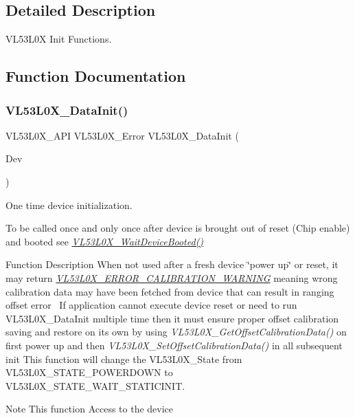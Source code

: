 \subsection{Detailed Description}
V\+L53\+L0X Init Functions. 



\subsection{Function Documentation}
\mbox{\label{group__VL53L0X__init__group_gabb81d6ad638363d555a1b1b038b23354}} 
\subsubsection{\texorpdfstring{V\+L53\+L0\+X\+\_\+\+Data\+Init()}{VL53L0X\_DataInit()}}
{\footnotesize\ttfamily V\+L53\+L0\+X\+\_\+\+A\+PI V\+L53\+L0\+X\+\_\+\+Error V\+L53\+L0\+X\+\_\+\+Data\+Init (\begin{DoxyParamCaption}\item[{\hyperlink{group__VL53L0X__platform__group_ga2d6405308b1dd524b462f1b8fb97d167}{V\+L53\+L0\+X\+\_\+\+D\+EV}}]{Dev }\end{DoxyParamCaption})}



One time device initialization. 

To be called once and only once after device is brought out of reset (Chip enable) and booted see {\itshape \hyperlink{group__VL53L0X__init__group_ga079f2bafbcb26cb4ccf897bb835fcdc8}{V\+L53\+L0\+X\+\_\+\+Wait\+Device\+Booted()}} 

\begin{DoxyParagraph}{Function Description}
When not used after a fresh device \char`\"{}power up\char`\"{} or reset, it may return {\itshape \hyperlink{group__VL53L0X__define__Error__group_ga4bc7046c2d7a01b8c925af91d5325a65}{V\+L53\+L0\+X\+\_\+\+E\+R\+R\+O\+R\+\_\+\+C\+A\+L\+I\+B\+R\+A\+T\+I\+O\+N\+\_\+\+W\+A\+R\+N\+I\+NG}} meaning wrong calibration data may have been fetched from device that can result in ranging offset error~\newline
If application cannot execute device reset or need to run V\+L53\+L0\+X\+\_\+\+Data\+Init multiple time then it must ensure proper offset calibration saving and restore on its own by using {\itshape V\+L53\+L0\+X\+\_\+\+Get\+Offset\+Calibration\+Data()} on first power up and then {\itshape V\+L53\+L0\+X\+\_\+\+Set\+Offset\+Calibration\+Data()} in all subsequent init This function will change the V\+L53\+L0\+X\+\_\+\+State from V\+L53\+L0\+X\+\_\+\+S\+T\+A\+T\+E\+\_\+\+P\+O\+W\+E\+R\+D\+O\+WN to V\+L53\+L0\+X\+\_\+\+S\+T\+A\+T\+E\+\_\+\+W\+A\+I\+T\+\_\+\+S\+T\+A\+T\+I\+C\+I\+N\+IT.
\end{DoxyParagraph}
\begin{DoxyNote}{Note}
This function Access to the device
\end{DoxyNote}

